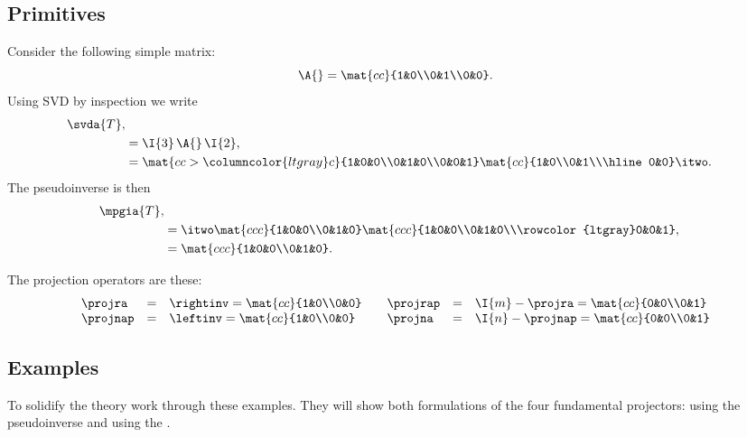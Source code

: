 \subsection{Primitives}
Consider the following simple matrix:
\begin{equation}
  \A{}= \mat{cc}{1&0\\0&1\\0&0}.
\end{equation}
Using SVD by inspection we write
\begin{equation}
\begin{split}
  \svda{T},\\
  &= \I{3}\, \A{}\, \I{2},\\
  &= \mat{cc>{\columncolor{ltgray}}c}{1&0&0\\0&1&0\\0&0&1} \mat{cc}{1&0\\0&1\\\hline0&0} \itwo.
\end{split}
\end{equation}
The pseudoinverse is then
\begin{equation}
  \begin{split}
     \mpgia{T}, \\
     & = \itwo \mat{ccc}{1&0&0\\0&1&0} \mat{ccc}{1&0&0\\0&1&0\\\rowcolor{ltgray}0&0&1},\\
     & = \mat{ccc}{1&0&0\\0&1&0}.
  \end{split}
\end{equation}

The projection operators are these:
\begin{equation}
  \begin{array}{lcllcl}
    \projra& = &\rightinv = \mat{cc}{1&0\\0&0} & \quad \projrap& = &\I{m}-\projra = \mat{cc}{0&0\\0&1}\\
    \projnap& =& \leftinv = \mat{cc}{1&0\\0&0} & \quad \projna& = &\I{n}-\projnap = \mat{cc}{0&0\\0&1}\\    
  \end{array}
  \label{eq:primitives}
\end{equation}

\subsection{Examples}
To solidify the theory work through these examples. They will show both formulations of the four fundamental projectors: using the pseudoinverse and using the \svdl.
